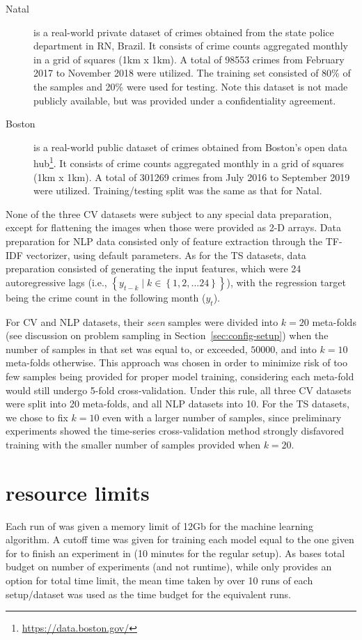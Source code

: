\begin{description}
\item[Natal]
is a real-world private dataset of crimes obtained from the state police department in RN, Brazil. It consists of crime counts aggregated monthly in a grid of squares (1km x 1km). A total of 98553 crimes from February 2017 to November 2018 were utilized. The training set consisted of 80\% of the samples and 20\% were used for testing. Note this dataset is not made publicly available, but was provided under a confidentiality agreement.

\item[Boston]
is a real-world public dataset of crimes obtained from Boston's open data hub\footnote{\url{https://data.boston.gov/}}.  It consists of crime counts aggregated monthly in a grid of squares (1km x 1km). A total of 301269 crimes from July 2016 to September 2019 were utilized. Training/testing split was the same as that for Natal.
\end{description}

None of the three CV datasets were subject to any special data preparation, except for flattening the images when those were provided as 2-D arrays. Data preparation for NLP data consisted only of feature extraction through the \sklearn TF-IDF vectorizer, using default parameters. As for the TS datasets, data preparation consisted of generating the input features, which were 24 autoregressive lags (i.e., $\left \{ y_{t-k} \mid k \in \left \{ 1,2,...24 \right \} \right \}$), with the regression target being the crime count in the following month ($y_t$).

For CV and NLP datasets, their \textit{seen} samples were divided into $k=20$ meta-folds (see discussion on problem sampling in Section~\ref{sec:config-setup}) when the number of samples in that set was equal to, or exceeded, $50000$, and into $k=10$ meta-folds otherwise. This approach was chosen in order to minimize risk of too few samples being provided for proper model training, considering each meta-fold would still undergo 5-fold cross-validation. Under this rule, all three CV datasets were split into 20 meta-folds, and all NLP datasets into 10. For the TS datasets, we chose to fix $k=10$ even with a larger number of samples, since preliminary experiments showed the time-series cross-validation method strongly disfavored training with the smaller number of samples provided when $k=20$.

\section{\autosklearn resource limits}
Each run of \autosklearn was given a memory limit of 12Gb for the machine learning algorithm. A cutoff time was given for training each model equal to the one given for \irace to finish an experiment in \isklearn (10 minutes for the regular setup). As \isklearn bases total budget on number of experiments (and not runtime), while \autosklearn only provides an option for total time limit, the mean time taken by \isklearn over 10 runs of each setup/dataset was used as the time budget for the equivalent \autosklearn runs.

